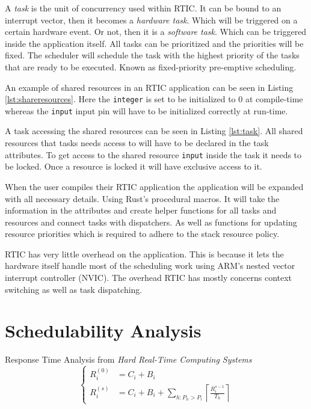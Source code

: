 A \emph{task} is the unit of concurrency used within RTIC. It can be bound to
an interrupt vector, then it becomes a \emph{hardware task}. Which will be
triggered on a certain hardware event. Or not, then it is a \emph{software
task}. Which can be triggered inside the application itself. All tasks can be
prioritized and the priorities will be fixed. The scheduler will schedule
the task with the highest priority of the tasks that are ready to be executed.
Known as fixed-priority pre-emptive scheduling\cite{fixedpriorityhistory}.

An example of shared resources in an RTIC application can be seen in Listing
\ref{lst:shareresources}. Here the \texttt{integer} is set to be initialized to
$0$ at compile-time whereas the \texttt{input} input pin will have to be initialized
correctly at run-time.


A task accessing the shared resources can be seen in Listing \ref{lst:task}.
All shared resources that tasks needs access to will have to be declared in the
task attributes. To get access to the shared resource \texttt{input} inside the
task it needs to be locked. Once a resource is locked it will have exclusive
access to it.


When the user compiles their RTIC application the application will be expanded
with all necessary details. Using Rust's procedural macros. It will take the
information in the attributes and create helper functions for all tasks and
resources and connect tasks with dispatchers. As well as functions for updating
resource priorities which is required to adhere to the stack resource policy.

RTIC has very little overhead on the application. This is because it lets the
hardware itself handle most of the scheduling work using ARM's nested vector
interrupt controller (NVIC).  The overhead RTIC has mostly concerns context switching
as well as task dispatching.

\section{Schedulability Analysis}
Response Time Analysis from \textit{Hard Real-Time Computing
Systems}\cite{hardrealtimecomputingsystems}
\begin{equation}
    \begin{cases}
        R_{i}^{(0)} &= C_i + B_i \\
        R_{i}^{(s)} &= C_i + B_i + \sum\limits_{h: P_h > P_i} \left\lceil \frac{R_{i}^{s-1}}{T_h} \right\rceil
    \end{cases}
\end{equation}


